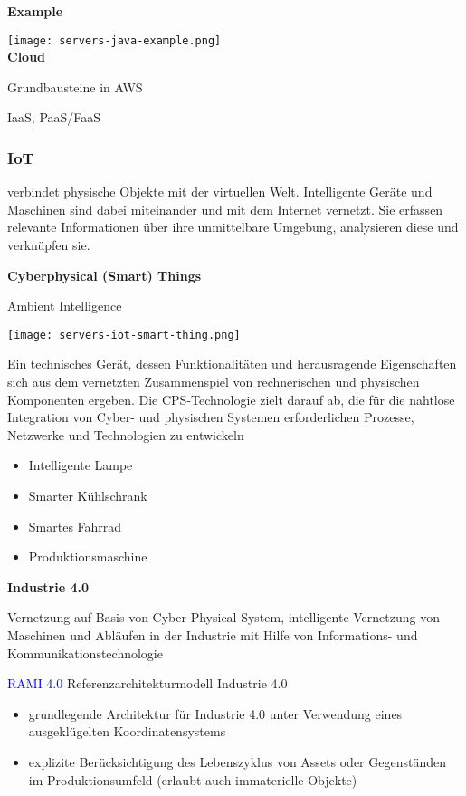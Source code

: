 \textbf{Example}

\texttt{[image: servers-java-example.png]} \\

\textbf{Cloud}

Grundbausteine in AWS

IaaS, PaaS/FaaS

\columnbreak
\subsubsection{IoT}
verbindet physische Objekte mit der virtuellen Welt. Intelligente Geräte und Maschinen sind dabei miteinander und mit dem Internet vernetzt. Sie erfassen relevante Informationen über ihre unmittelbare Umgebung, analysieren diese und verknüpfen sie.

\textbf{Cyberphysical (Smart) Things}

Ambient Intelligence

\texttt{[image: servers-iot-smart-thing.png]}

Ein technisches Gerät, dessen Funktionalitäten und herausragende Eigenschaften sich aus dem vernetzten Zusammenspiel von rechnerischen und physischen Komponenten ergeben. Die CPS-Technologie zielt darauf ab, die für die nahtlose Integration von Cyber- und physischen Systemen erforderlichen Prozesse, Netzwerke und Technologien zu entwickeln

\begin{itemize}
    \item Intelligente Lampe
    \item Smarter Kühlschrank
    \item Smartes Fahrrad
    \item Produktionsmaschine
\end{itemize}
\vspace{10pt}
\textbf{Industrie 4.0}

Vernetzung auf Basis von Cyber-Physical System, intelligente Vernetzung von Maschinen und Abläufen in der Industrie mit Hilfe von Informations- und Kommunikationstechnologie

\textcolor{blue}{RAMI 4.0}
Referenzarchitekturmodell Industrie 4.0

\begin{itemize}
    \item grundlegende Architektur für Industrie 4.0 unter Verwendung eines ausgeklügelten Koordinatensystems
    \item explizite Berücksichtigung des Lebenszyklus von Assets oder Gegenständen im Produktionsumfeld (erlaubt auch immaterielle Objekte)
\end{itemize}

